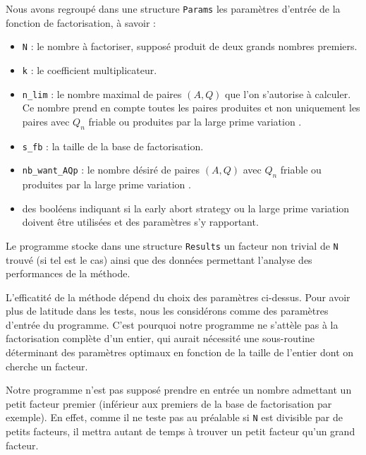 Nous avons regroupé dans une structure \texttt{Params} les paramètres d'entrée 
de la fonction de factorisation, à savoir :

\begin{itemize}
    \item \texttt{N} : le nombre à factoriser, supposé produit de deux grands
                       nombres premiers.
    \item \texttt{k} : le coefficient multiplicateur.
    \item \texttt{n\_lim} : le nombre maximal de paires $(A,Q)$ que l'on 
                             s'autorise à calculer. Ce nombre prend en compte
                             toutes les paires produites et non uniquement les
                             paires avec $Q_n$ friable ou produites par la \og 
                             large prime variation \fg{}.
    \item \texttt{s\_fb} : la taille de la base de factorisation. 
    \item \texttt{nb\_want\_AQp} : le nombre désiré de paires $(A,Q)$ avec $Q_n$ 
                                 friable ou produites par la \og large prime 
                                 variation \fg{}.
    \item des booléens indiquant si la \og early abort strategy \fg{} ou la 
          \og large prime variation \fg{} doivent être utilisées et des paramètres
          s'y rapportant.

\end{itemize}

Le programme stocke dans une structure \texttt{Results} un facteur non trivial
de \texttt{N} trouvé (si tel est le cas) ainsi que des données permettant 
l'analyse des performances de la méthode.  

\begin{remarque}
L'efficatité de la méthode dépend du choix des paramètres ci-dessus. Pour avoir
plus de latitude dans les tests, nous les considérons comme des paramètres 
d'entrée du programme. C'est pourquoi notre programme ne s'attèle pas à la
factorisation complète d'un entier, qui aurait nécessité une sous-routine 
déterminant des paramètres optimaux en fonction de la taille de l'entier 
dont on cherche un facteur. 
   
\end{remarque}

\begin{remarque}
Notre programme n'est pas supposé prendre en entrée un nombre admettant un petit
facteur premier (inférieur aux premiers de la base de factorisation par exemple).
En effet, comme il ne teste pas au préalable si \texttt{N} est divisible par de 
petits facteurs, il mettra autant de temps à trouver un petit facteur qu'un
grand facteur.
\end{remarque}

